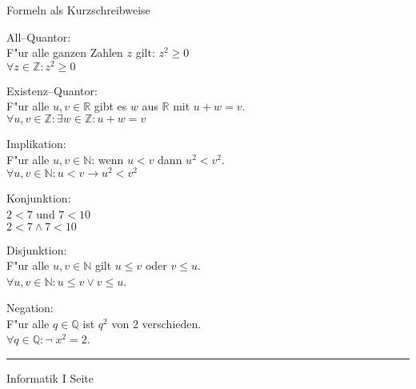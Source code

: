 \begin{slide}{}
\normalsize
\begin{center}
Formeln als Kurzschreibweise
\end{center}
\vspace{0.5cm}

\footnotesize
All--Quantor: \\[0.3cm]
\hspace*{1.3cm} F"ur alle ganzen Zahlen $z$ gilt: $z^2 \geq 0$ \\[0.3cm]
\hspace*{1.3cm} $\forall z \in \mathbb{Z} : z^2 \geq 0$
\vspace{0.5cm}

Existenz--Quantor: \\[0.3cm]
\hspace*{1.3cm} F"ur alle  $u, v \in \mathbb{R}$ gibt es $w$ aus $\mathbb{R}$ mit 
                $u + w = v$. \\[0.3cm]
\hspace*{1.3cm} $\forall u,v \in \mathbb{Z}:  \exists w \in \mathbb{Z} : u + w = v$
\vspace{0.5cm}

Implikation: \\[0.3cm]
\hspace*{1.3cm} F"ur alle $u,v \in \mathbb{N}$: wenn $u < v$ dann $u^2 < v^2$. \\[0.3cm]
\hspace*{1.3cm} $\forall u, v \in \mathbb{N}: u < v \rightarrow u^2 < v^2$
\vspace{0.5cm}

Konjunktion: \\[0.3cm]
\hspace*{1.3cm} $2 < 7$ und $7 < 10$ \\[0.3cm] 
\hspace*{1.3cm} $2 < 7 \wedge 7 < 10$
\vspace{0.5cm}

Disjunktion: \\[0.3cm]
\hspace*{1.3cm} F"ur alle $u,v \in \mathbb{N}$ gilt $u \leq v$ oder $v \leq u$. \\[0.3cm] 
\hspace*{1.3cm} $\forall u,v \in \mathbb{N}: u \leq v \vee v \leq u$.
\vspace{0.5cm}

Negation: \\[0.3cm]
\hspace*{1.3cm} F"ur alle $q \in \mathbb{Q}$ ist $q^2$ von 2 verschieden.\\[0.3cm]
\hspace*{1.3cm} $\forall q \in \mathbb{Q}: \neg\; x^2 = 2$.

\vspace*{\fill}
\tiny \addtocounter{mypage}{1}
\rule{15cm}{1mm}
Informatik I  \hspace*{\fill} Seite 
\end{slide}

